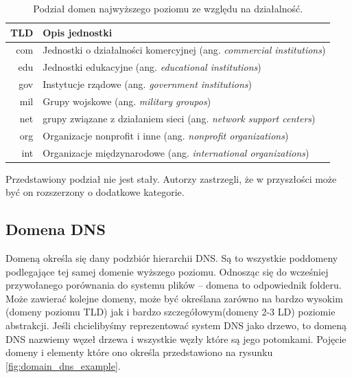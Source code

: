 \begin{table}[]
	\centering
	\caption{Podział domen najwyższego poziomu ze względu na działalność.}
	\label{podzial_tld}
	\begin{tabular}{|r|p{10.5cm}|}
		\hline
		\textbf{TLD} & \textbf{Opis jednostki} \\
		\hline\hline
		com & Jednostki o działalności komercyjnej (ang. \textit{commercial institutions}) \\
		\hline
		edu & Jednostki edukacyjne (ang. \textit{educational institutions})\\
		\hline
		gov & Instytucje rządowe (ang. \textit{government institutions}) \\
		\hline
		mil & Grupy wojskowe (ang. \textit{military groupos}) \\
		\hline
		net & grupy związane z działaniem sieci (ang. \textit{network support centers}) \\
		\hline
		org & Organizacje nonprofit i inne (ang. \textit{nonprofit organizations}) \\
		\hline
		int & Organizacje międzynarodowe (ang. \textit{international organizations}) \\
		\hline
	\end{tabular}
\end{table}

Przedstawiony podział nie jest stały. Autorzy zastrzegli, że w przyszłości może być on rozszerzony o dodatkowe kategorie.

\subsection{Domena DNS}
Domeną określa się dany podzbiór hierarchii DNS. Są to wszystkie poddomeny podlegające tej samej domenie wyższego poziomu. Odnosząc
się do wcześniej przywołanego porównania do systemu plików -- domena to odpowiednik folderu. Może zawierać kolejne domeny, może być
określana zarówno na bardzo wysokim (domeny poziomu TLD) jak i bardzo szczegółowym(domeny 2-3 LD) poziomie abstrakcji. Jeśli
chcielibyśmy reprezentować system DNS jako drzewo, to domeną DNS nazwiemy węzeł drzewa i wszystkie węzły które są jego potomkami.
Pojęcie domeny i elementy które ono określa przedstawiono na rysunku \ref{fig:domain_dns_example}.

